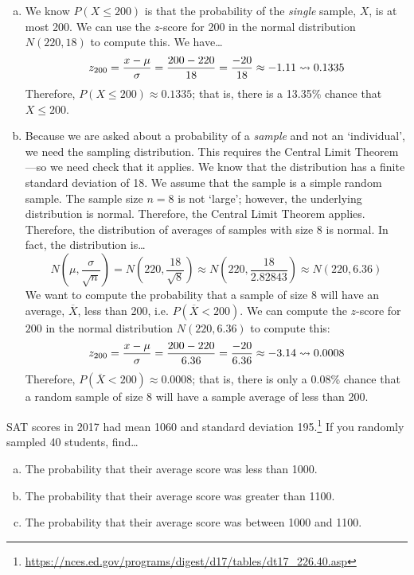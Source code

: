 \documentclass[11pt,letterpaper]{article}
\begin{document}
\begin{enumerate}[(a)]
\item We know $P(X \leq 200)$ is that the probability of the \textit{single} sample, $X$, is at most 200. We can use the $z$-score for 200 in the normal distribution $N(220, 18)$ to compute this. We have\dots
	\[
	z_{200}= \dfrac{x - \mu}{\sigma}= \dfrac{200 - 220}{18}= \dfrac{-20}{18} \approx -1.11 \rightsquigarrow 0.1335 
	\]
Therefore, $P(X \leq 200) \approx 0.1335$; that is, there is a 13.35\% chance that $X \leq 200$. \pspace

\item Because we are asked about a probability of a \textit{sample} and not an `individual', we need the sampling distribution. This requires the Central Limit Theorem---so we need check that it applies. We know that the distribution has a finite standard deviation of 18. We assume that the sample is a simple random sample. The sample size $n= 8$ is not `large'; however, the underlying distribution is normal. Therefore, the Central Limit Theorem applies. Therefore, the distribution of averages of samples with size 8 is normal. In fact, the distribution is\dots
	\[
	N\left(\mu, \dfrac{\sigma}{\sqrt{n}} \right)= N\left(220, \dfrac{18}{\sqrt{8}} \right) \approx N\left(220, \dfrac{18}{2.82843} \right) \approx N\left(220, 6.36 \right)
	\]
We want to compute the probability that a sample of size 8 will have an average, $\overline{X}$, less than 200, i.e. $P(\overline{X} < 200)$. We can compute the $z$-score for $200$ in the normal distribution $N(220, 6.36)$ to compute this:
	\[
	z_{200}= \dfrac{x - \mu}{\sigma}= \dfrac{200 - 220}{6.36}= \dfrac{-20}{6.36} \approx -3.14 \rightsquigarrow 0.0008
	\]
Therefore, $P(\overline{X} < 200) \approx 0.0008$; that is, there is only a 0.08\% chance that a random sample of size 8 will have a sample average of less than 200. 
\end{enumerate}



\newpage



 SAT scores in 2017 had mean 1060 and standard deviation 195.\footnote{\url{https://nces.ed.gov/programs/digest/d17/tables/dt17_226.40.asp}} If you randomly sampled 40 students, find\dots
	\begin{enumerate}[(a)]
	\item The probability that their average score was less than 1000. 
	\item The probability that their average score was greater than 1100. 
	\item The probability that their average score was between 1000 and 1100. 
	\end{enumerate} \pspace
\end{document}
